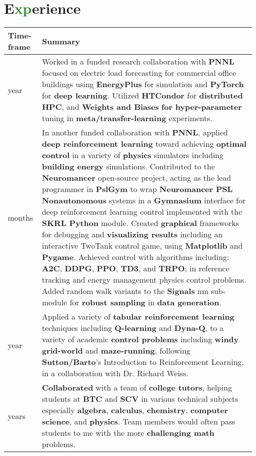 \documentclass[letterpaper]{twentysecondcv} %
\begin{document}
\section{E\textcolor{ForestGreen}{xp}erience}
\setlength{\tabcolsep}{8pt}  %
\renewcommand{\arraystretch}{1.5} %
\begin{tabular}{|>{\centering\arraybackslash}m{}|>{\RaggedRight\arraybackslash}m{}|}
\hline
Time-frame & Summary\\\hline
1 year & Worked in a funded research collaboration with \textbf{PNNL} focused on electric load forecasting for commercial office buildings using \textbf{EnergyPlus} for simulation and \textbf{PyTorch} for \textbf{deep learning}. Utilized \textbf{HTCondor} for \textbf{distributed} \textbf{HPC}, and \textbf{Weights and Biases} \textbf{for hyper-parameter} tuning in \textbf{meta/transfer-learning} experiments.\\\hline
9 months & In another funded collaboration with \textbf{PNNL}, applied \textbf{deep reinforcement learning} toward achieving \textbf{optimal control} in a variety of \textbf{physics} simulators including \textbf{building energy} simulations. Contributed to the \textbf{Neuromancer} open-source project, acting as the lead programmer in \textbf{PslGym} to wrap \textbf{Neuromancer PSL Nonautonomous} systems in a \textbf{Gymnasium} interface for deep reinforcement learning control implemented with the \textbf{SKRL Python} module. Created \textbf{graphical} frameworks for debugging and \textbf{visualizing results} including an interactive TwoTank control game, using \textbf{Matplotlib} and \textbf{Pygame}. Achieved control with algorithms including: \textbf{A2C}, \textbf{DDPG}, \textbf{PPO}, \textbf{TD3}, and \textbf{TRPO}; in reference tracking and energy management physics control problems. Added random walk variants to the \textbf{Signals} nm sub-module for \textbf{robust sampling} in \textbf{data generation}.\\\hline
1 year & Applied a variety of \textbf{tabular reinforcement learning} techniques including \textbf{Q-learning} and \textbf{Dyna-Q}, to a variety of academic \textbf{control problems} including \textbf{windy grid-world} and \textbf{maze-running}, following \textbf{Sutton/Barto}'s Introduction to Reinforcement Learning, in a collaboration with Dr. Richard Weiss.\\\hline
2 years & \textbf{Collaborated} with a team of \textbf{college tutors}, helping students at \textbf{BTC} and \textbf{SCV} in various technical subjects especially \textbf{algebra}, \textbf{calculus}, \textbf{chemistry}, \textbf{computer science}, and \textbf{physics}. Team members would often pass students to me with the more \textbf{challenging math} problems.\\\hline
\end{tabular}
\end{document}

